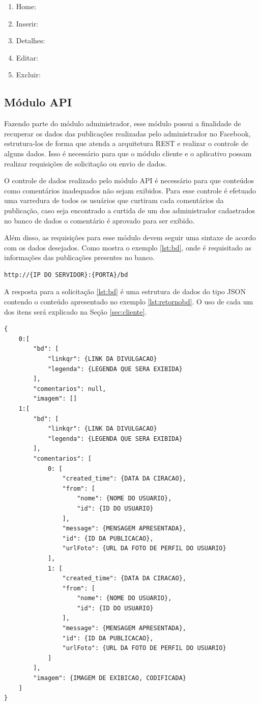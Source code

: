 \begin{enumerate}
   \item Home: 
   \item Inserir: 
   \item Detalhes: 
   \item Editar: 
   \item Excluir: 
 \end{enumerate}

\subsection{Módulo API}
Fazendo parte do módulo administrador, esse módulo possui a finalidade de recuperar os dados das publicações realizadas pelo administrador no Facebook, estrutura-los de forma que atenda a arquitetura REST e realizar o controle de alguns dados. Isso é necessário para que o módulo cliente e o aplicativo possam realizar requisições de solicitação ou envio de dados.

O controle de dados realizado pelo módulo API é necessário para que conteúdos como comentários inadequados não sejam exibidos. Para esse controle é efetuado uma varredura de todos os usuários que curtiram cada comentários da publicação, caso seja encontrado a curtida de um dos administrador cadastrados no banco de dados o comentário é aprovado para ser exibido.

Além disso, as requisições para esse módulo devem seguir uma sintaxe de acordo com os dados desejados. Como mostra o exemplo \ref{lst:bd}, onde é requisitado as informações das publicações presentes no banco.

\begin{lstlisting}[caption={Requisitando dados para divulgação},label={lst:bd}]
	http://{IP DO SERVIDOR}:{PORTA}/bd
\end{lstlisting}

A resposta para a solicitação \ref{lst:bd} é uma estrutura de dados do tipo JSON contendo o conteúdo apresentado no exemplo \ref{lst:retornobd}. O uso de cada um dos itens será explicado na Seção \ref{sec:cliente}.

\begin{lstlisting}[caption={Retorno da requisição \ref{lst:bd}},label={lst:retornobd}]
{
	0:[
		"bd": [
			"linkqr": {LINK DA DIVULGACAO}
			"legenda": {LEGENDA QUE SERA EXIBIDA}		
		],
		"comentarios": null,
		"imagem": []
	1:[
		"bd": [
			"linkqr": {LINK DA DIVULGACAO}
			"legenda": {LEGENDA QUE SERA EXIBIDA}
		],
		"comentarios": [
			0: [
				"created_time": {DATA DA CIRACAO},
				"from": [
					"nome": {NOME DO USUARIO},
					"id": {ID DO USUARIO}
				],
				"message": {MENSAGEM APRESENTADA},
				"id": {ID DA PUBLICACAO},
				"urlFoto": {URL DA FOTO DE PERFIL DO USUARIO}
			],
			1: [
				"created_time": {DATA DA CIRACAO},
				"from": [
					"nome": {NOME DO USUARIO},
					"id": {ID DO USUARIO}
				],
				"message": {MENSAGEM APRESENTADA},
				"id": {ID DA PUBLICACAO},
				"urlFoto": {URL DA FOTO DE PERFIL DO USUARIO}
			]
		],
		"imagem": {IMAGEM DE EXIBICAO, CODIFICADA}
	]
}
\end{lstlisting}

